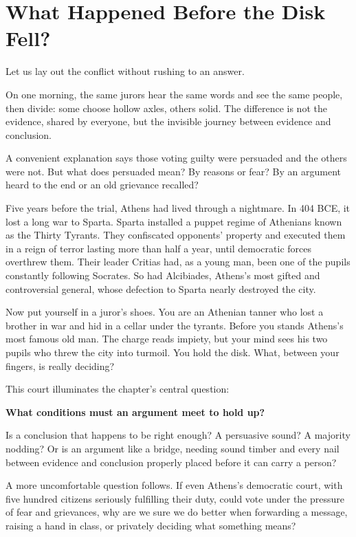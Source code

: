 \section{What Happened Before the Disk Fell?}
Let us lay out the conflict without rushing to an answer.

On one morning, the same jurors hear the same words and see the same people, then divide: some choose hollow axles, others solid. The difference is not the evidence, shared by everyone, but the invisible journey between evidence and conclusion.

A convenient explanation says those voting guilty were persuaded and the others were not. But what does persuaded mean? By reasons or fear? By an argument heard to the end or an old grievance recalled?

Five years before the trial, Athens had lived through a nightmare. In 404 BCE, it lost a long war to Sparta. Sparta installed a puppet regime of Athenians known as the Thirty Tyrants. They confiscated opponents' property and executed them in a reign of terror lasting more than half a year, until democratic forces overthrew them. Their leader Critias had, as a young man, been one of the pupils constantly following Socrates. So had Alcibiades, Athens's most gifted and controversial general, whose defection to Sparta nearly destroyed the city.

Now put yourself in a juror's shoes. You are an Athenian tanner who lost a brother in war and hid in a cellar under the tyrants. Before you stands Athens's most famous old man. The charge reads impiety, but your mind sees his two pupils who threw the city into turmoil. You hold the disk. What, between your fingers, is really deciding?

This court illuminates the chapter's central question:

\textbf{What conditions must an argument meet to hold up?}

Is a conclusion that happens to be right enough? A persuasive sound? A majority nodding? Or is an argument like a bridge, needing sound timber and every nail between evidence and conclusion properly placed before it can carry a person?

A more uncomfortable question follows. If even Athens's democratic court, with five hundred citizens seriously fulfilling their duty, could vote under the pressure of fear and grievances, why are we sure we do better when forwarding a message, raising a hand in class, or privately deciding what something means?

